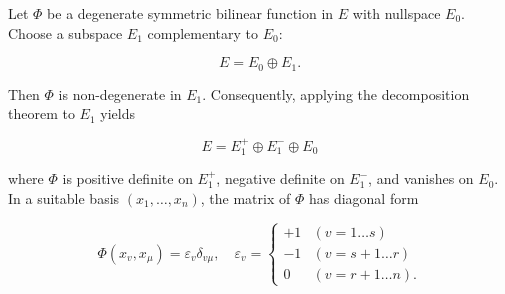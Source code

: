 Let $\Phi$ be a degenerate symmetric bilinear function in $E$ with nullspace $E_0$. Choose a subspace $E_1$ complementary to $E_0$:

$$E = E_0 \oplus E_1.$$

Then $\Phi$ is non-degenerate in $E_1$. Consequently, applying the decomposition theorem to $E_1$ yields

$$E = E_1^+ \oplus E_1^- \oplus E_0$$

where $\Phi$ is positive definite on $E_1^+$, negative definite on $E_1^-$, and vanishes on $E_0$. In a suitable basis $(x_1, \ldots, x_n)$, the matrix of $\Phi$ has diagonal form

$$\Phi(x_v, x_\mu) = \varepsilon_v \delta_{v\mu}, \quad \varepsilon_v = \begin{cases} +1 & (v = 1 \ldots s) \\ -1 & (v = s+1 \ldots r) \\ 0 & (v = r+1 \ldots n). \end{cases}$$
